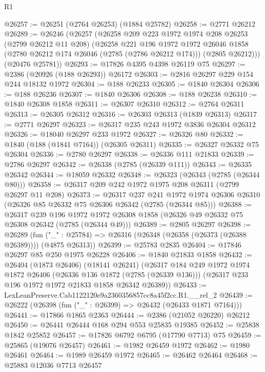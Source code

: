 \begin{lexlean}{R1}
\begin{coremodule}
@26257 := @26251 (@2764 @26253) (@1884 @25782)
@26258 := @2771 @26212
@26289 := @26246
    (@26257
      (@26258
        @209
        @223
        @1972
        @1974
        @208
        @26253
        (@2799 @26212 @11 @208)
        (@26258
          @221
          @196
          @1972
          @1972
          @26046
          @1858
          (@2780 @26212 @174 @26046 (@2785 (@2786 @26212 @174)))
          (@2805 @26212)))
      (@20476 @25781))
@26293 := @17826 @4395 @4398 @26119 @75
@26297 := @2386 (@20926 (@188 @26293)) @26172
@26303 := @2816 @26297 @229 @154 @244 @18132 @1972
@26304 := @188 @26233
@26305 := @1840 @26304
@26306 := @188 @26236
@26307 := @1840 @26306
@26308 := @188 @26238
@26310 := @1840 @26308 @1858
@26311 := @26307 @26310
@26312 := @2764 @26311
@26313 := @26305 @26312
@26316 := @26303 @26313 (@1839 @26313)
@26317 := @2771 @26297
@26323 := @26317 @235 @243 @1972 @3836 @26304 @26312
@26326 := @18040 @26297 @233 @1972
@26327 := @26326 @80
@26332 := @1840 (@188 (@1841 @7164)) (@26305 @26311)
@26335 := @26327 @26332 @75 @26304
@26336 := @2780 @26297
@26338 := @26336 @111 @21833
@26339 := @2786 @26297
@26342 := @26338 (@2785 (@26339 @111))
@26343 := @26335 @26342
@26344 := @18059 @26332
@26348 := @26323 (@26343 (@2785 (@26344 @80)))
@26358 := @26317 @209 @242 @1972 @1975 @208 @26311 (@2799 @26297 @11 @208)
@26373 := @26317
    @237
    @241
    @1972
    @1974
    @26306
    @26310
    (@26326 @85 @26332 @75 @26306 @26342 (@2785 (@26344 @85)))
@26388 := @26317
    @239
    @196
    @1972
    @1972
    @26308
    @1858
    (@26326 @49 @26332 @75 @26308 @26342 (@2785 (@26344 @49)))
@26389 := @2805 @26297
@26398 := @26289
    (fun ("_" : @25784) => @26316 (@26348 (@26358 (@26373 (@26388 @26389)))) (@4875 @26313))
@26399 := @25783 @2835
@26404 := @17846 @26297 @85 @250 @1975 @26228
@26406 := @1840 @21833 @1858
@26432 := @26404
    (@1873 @26406)
    (@18141 @26241)
    (@26317
      @184
      @249
      @1972
      @1974
      @1872
      @26406
      (@26336 @136 @1872 (@2785 (@26339 @136)))
      (@26317 @233 @196 @1972 @1972 @21833 @1858 @26342 @26389))
@26433 := LexLeanPreserve.Cab1122120e9a2360356857cc8a45f2cc.R1.__rel_2
@26439 := @26222 (@26398 (fun ("_" : @26399) => @26432 (@26433 @1871 @7164)))
@26441 := @17866 @1865 @2363
@26444 := @2386 (@21052 @26220) @26212
@26450 := @26441 @26444 @168 @294 @553 @25835 @19385
@26452 := @25838 @1842 @25852
@26457 := @17826 @6792 @6795 (@17790 @7713) @75
@26459 := @25865 (@19076 @26457)
@26461 := @1982 @26459 @1972
@26462 := @1980 @26461
@26464 := @1989 @26459 @1972
@26465 := @26462 @26464
@26468 := @25883 @12036 @7713 @26457

\end{coremodule}
\end{lexlean}
